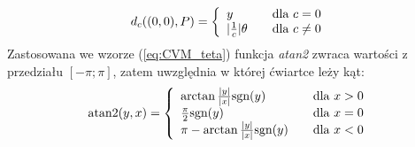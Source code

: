 	\begin{equation}
	d_c((0,0),P)= \left\{ 
	\begin{array}{l l}
  	y& \quad \mbox{dla $c=0$}\\
  	|\frac{1}{c}|\theta & \quad \mbox{dla $c\neq0$}\\
	\end{array} \right. 
	\end{equation}
	Zastosowana we wzorze (\ref{eq:CVM_teta}) funkcja \emph{atan2} zwraca wartości z przedziału $[-\pi;\pi]$, zatem uwzględnia w której ćwiartce leży kąt:
	\begin{equation}\label{eq:atan2}
	\text{atan2}(y,x)= \left\{ 
	\begin{array}{l l}
	\arctan{\frac{|y|}{|x|}} \text{sgn}{(y)} & \quad \mbox{dla $x>0$}\\
	\frac{\pi}{2}\text{sgn}{(y)} & \quad \mbox{dla $x=0$}\\
	\pi-\arctan{\frac{|y|}{|x|}} \text{sgn}{(y)} & \quad \mbox{dla $x<0$}\\
	\end{array} \right. 
	\end{equation}
	
